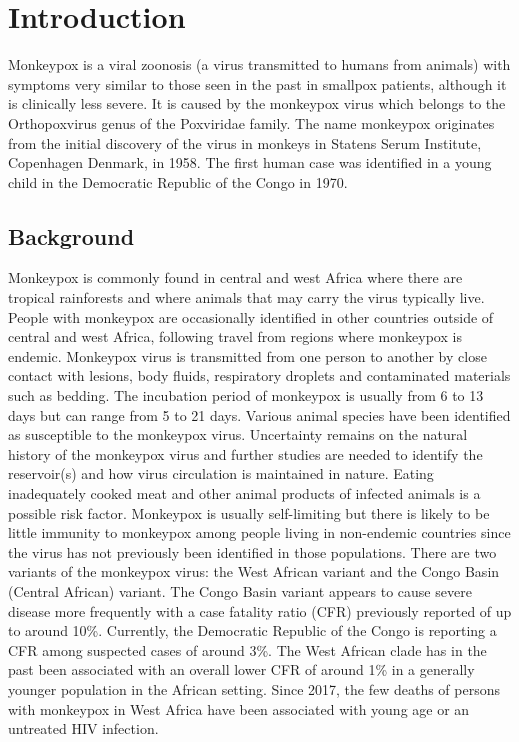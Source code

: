 \chapter{Introduction}
Monkeypox is a viral zoonosis (a virus transmitted to humans from animals) with symptoms very similar to those seen in the past in smallpox patients, although it is clinically less severe. It is caused by the monkeypox virus which belongs to the Orthopoxvirus genus of the Poxviridae family. The name monkeypox originates from the initial discovery of the virus in monkeys in Statens Serum Institute, Copenhagen Denmark, in 1958. The first human case was identified in a young child in the Democratic Republic of the Congo in 1970.

\section{Background}
Monkeypox is commonly found in central and west Africa where there are tropical rainforests and where animals that may carry the virus typically live. People with monkeypox are occasionally identified in other countries outside of central and west Africa, following travel from regions where monkeypox is endemic.
Monkeypox virus is transmitted from one person to another by close contact with lesions, body fluids, respiratory droplets and contaminated materials such as bedding. The incubation period of monkeypox is usually from 6 to 13 days but can range from 5 to 21 days.
Various animal species have been identified as susceptible to the monkeypox virus. Uncertainty remains on the natural history of the monkeypox virus and further studies are needed to identify the reservoir(s) and how virus circulation is maintained in nature. Eating inadequately cooked meat and other animal products of infected animals is a possible risk factor.
Monkeypox is usually self-limiting but there is likely to be little immunity to monkeypox among people living in non-endemic countries since the virus has not previously been identified in those populations. There are two variants of the monkeypox virus: the West African variant and the Congo Basin (Central African) variant. The Congo Basin variant appears to cause severe disease more frequently with a case fatality ratio (CFR) previously reported of up to around 10\%. Currently, the Democratic Republic of the Congo is reporting a CFR among suspected cases of around 3\%. The West African clade has in the past been associated with an overall lower CFR of around 1\% in a generally younger population in the African setting. Since 2017, the few deaths of persons with monkeypox in West Africa have been associated with young age or an untreated HIV infection.

